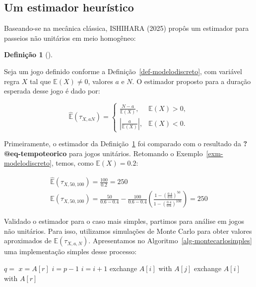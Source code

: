 \documentclass[
  brazilian,
  12pt,
]{article}
\theoremstyle{definition}
\newtheorem{definition}{Definição}[section]
\theoremstyle{definition}
\theoremstyle{remark}
\begin{document}
\subsection{Um estimador heurístico}\label{um-estimador-heuruxedstico}

Baseando-se na mecânica clássica, ISHIHARA (2025) propôs um estimador
para passeios não unitários em meio homogêneo:

\begin{definition}[]\protect\hypertarget{def-estimadorsimples}{}\label{def-estimadorsimples}

Seja um jogo definido conforme a Definição~\ref{def-modelodiscreto}, com
variável regra \(X\) tal que \(\mathbb{E}(X) \neq 0\), valores \(a\) e
\(N\). O estimador proposto para a duração esperada desse jogo é dado
por:

\[
\hat{\mathbb{E}}(\tau_{X, a N}) = \begin{cases}
\frac{N-a}{\mathbb{E}(X)},  & \mathbb{E}(X) > 0, \\
\left \lvert \frac{a}{\mathbb{E}(X)} \right \rvert,  & \mathbb{E}(X) < 0.
\end{cases}
\]

\end{definition}

Primeiramente, o estimador da Definição~\ref{def-estimadorsimples} foi
comparado com o resultado da \textbf{?@eq-tempoteorico} para jogos
unitários. Retomando o Exemplo~\ref{exm-modelodiscreto}, temos, como
\(\mathbb{E}(X) = 0.2\):

\[
\begin{aligned}
\hat{\mathbb{E}}(\tau_{X, 50, 100}) = \frac{100}{0.2} = 250 \\
\mathbb{E}(\tau_{X, 50, 100}) = \frac{50}{0.6 - 0.4} - \frac{100}{0.6 - 0.4}
\left( \frac{1 - \left( \frac{0.4}{0.6} \right)^{50}}{1 - \left( \frac{0.4}{0.6}
\right)^{100}} \right) = 250
\end{aligned}
\]

Validado o estimador para o caso mais simples, partimos para análise em
jogos não unitários. Para isso, utilizamos simulações de Monte Carlo
para obter valores aproximados de \(\mathbb{E}(\tau_{X, a, N})\).
Apresentamos no Algoritmo~\ref{alg-montecarlosimples} uma implementação
simples desse processo:

\begin{algorithm}[htb!]
\caption{\label{alg-montecarlosimples}Quicksort}
\begin{algorithmic}[1]
    \State $q = $ 
    \State {}
    \State {}
  \EndIf
\EndProcedure
{}
  \State $x = A[r]$
  \State $i = p - 1$
      \State $i = i + 1$
      \State exchange
      $A[i]$ with     $A[j]$
    \EndIf
    \State exchange $A[i]$ with $A[r]$
  \EndFor
\EndProcedure
\end{algorithmic}
\end{algorithm}
\end{document}
